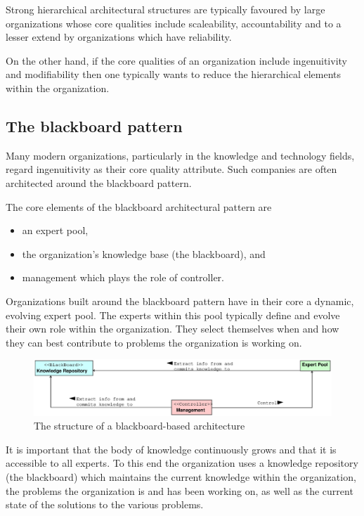\documentclass[11pt,english,a4]{article}
\begin{document}
Strong hierarchical architectural structures are typically favoured by large organizations whose core qualities include scaleability, accountability and to a lesser extend by organizations which have reliability.

On the other hand, if the core qualities of an organization include ingenuitivity and modifiability then one typically wants to reduce the hierarchical elements within the organization.

\subsection{The blackboard pattern}

Many modern organizations, particularly in the knowledge and technology fields, regard ingenuitivity as their core quality attribute. Such companies are often architected around the blackboard pattern.

The core elements of the blackboard architectural pattern are 
\begin{itemize}
  \item an expert pool,
  \item the organization's knowledge base (the blackboard), and
  \item management which plays the role of controller.
\end{itemize}
\noindent  
Organizations built around the blackboard pattern have in their core a dynamic, evolving expert pool. The experts within this pool typically define and evolve their own role within the organization. They select themselves when and how they can best contribute to problems the organization is working on.

\begin{figure}[hbt]
  \begin{center}
    \includegraphics[scale=0.4]{blackboardStructure}
    \caption{The structure of a blackboard-based architecture}\label{blackboardStructure_fig}
  \end{center}
\end{figure}

It is important that the body of knowledge continuously grows and that it is accessible to all experts. To this end the organization uses a knowledge repository (the blackboard) which maintains the current knowledge within the organization, the problems the organization is and has been working on, as well as the current state of the solutions to the various problems.
\end{document}

